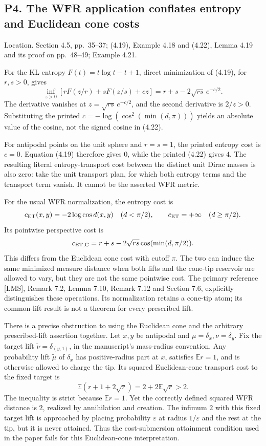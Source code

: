 \documentclass[10pt]{article}
\begin{document}
\subsection*{P4. The WFR application conflates entropy and Euclidean cone costs}
Location. Section 4.5, pp. 35–37; (4.19), Example 4.18 and (4.22), Lemma 4.19 and its proof on pp. 48–49; Example 4.21.\par
For the KL entropy \(F(t)=t\log t-t+1\), direct minimization of (4.19), for \(r,s>0\), gives \[\inf_{z>0}\left[rF(z/r)+sF(z/s)+cz\right]
 =r+s-2\sqrt{rs}\,e^{-c/2}.\] The derivative vanishes at \(z=\sqrt{rs}\,e^{-c/2}\), and the second derivative is \(2/z>0\). Substituting the printed \(c=-\log(\cos^2(\min(d,\pi)))\) yields an absolute value of the cosine, not the signed cosine in (4.22).\par
For antipodal points on the unit sphere and \(r=s=1\), the printed entropy cost is \(c=0\). Equation (4.19) therefore gives \(0\), while the printed (4.22) gives \(4\). The resulting literal entropy-transport cost between the distinct unit Dirac masses is also zero: take the unit transport plan, for which both entropy terms and the transport term vanish. It cannot be the asserted WFR metric.\par
For the usual WFR normalization, the entropy cost is \[c_{\rm ET}(x,y)=-2\log\cos d(x,y)\quad(d<\pi/2),
 \qquad c_{\rm ET}=+\infty\quad(d\ge\pi/2).\] Its pointwise perspective cost is \[c_{\rm ET,C}=r+s-2\sqrt{rs}\cos(\min(d,\pi/2)).\] This differs from the Euclidean cone cost with cutoff \(\pi\). The two can induce the same minimized measure distance when both lifts and the cone-tip reservoir are allowed to vary, but they are not the same pointwise cost. The primary reference [LMS], Remark 7.2, Lemma 7.10, Remark 7.12 and Section 7.6, explicitly distinguishes these operations. Its normalization retains a cone-tip atom; its common-lift result is not a theorem for every prescribed lift.\par
There is a precise obstruction to using the Euclidean cone and the arbitrary prescribed-lift assertion together. Let \(x,y\) be antipodal and \(\mu=\delta_x,\nu=\delta_y\). Fix the target lift \(\widetilde\nu=\delta_{(y,1)}\), in the manuscript’s mass-radius convention. Any probability lift \(\widetilde\mu\) of \(\delta_x\) has positive-radius part at \(x\), satisfies \(\mathbb Er=1\), and is otherwise allowed to charge the tip. Its squared Euclidean-cone transport cost to the fixed target is \[\mathbb E(r+1+2\sqrt r)=2+2\mathbb E\sqrt r>2.\] The inequality is strict because \(\mathbb Er=1\). Yet the correctly defined squared WFR distance is \(2\), realized by annihilation and creation. The infimum \(2\) with this fixed target lift is approached by placing probability \(\varepsilon\) at radius \(1/\varepsilon\) and the rest at the tip, but it is never attained. Thus the cost-submersion attainment condition used in the paper fails for this Euclidean-cone interpretation.\par
\end{document}
